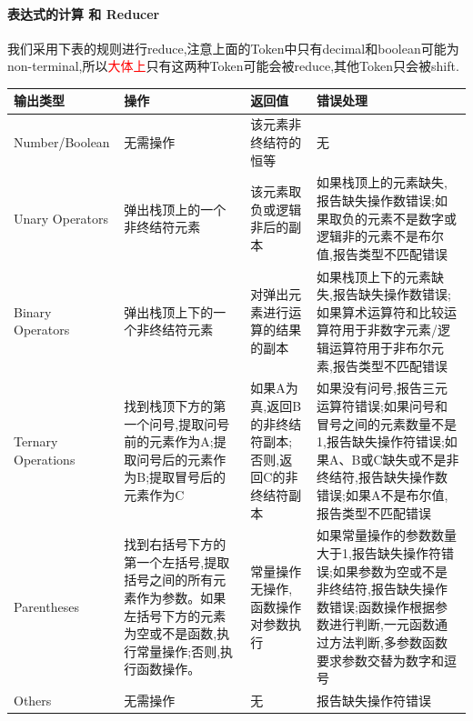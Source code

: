 \documentclass{article}
\begin{document}
\paragraph{表达式的计算 和 Reducer\\}
我们采用下表的规则进行reduce,注意上面的Token中只有decimal和boolean可能为non-terminal,所以\textcolor{red}{大体上}只有这两种Token可能会被reduce,其他Token只会被shift.

\begin{table}[H]
    \centering
    \small
    \begin{tabular}{|m{3.5cm}|m{3cm}|m{3cm}|m{5cm}|}
        \hline
        \textbf{输出类型}        & \textbf{操作}                                                        & \textbf{返回值}                   & \textbf{错误处理}                                                                              \\
        \hline
        Number/Boolean       & 无需操作                                                               & 该元素非终结符的恒等                     & 无                                                                                          \\
        \hline

        Unary Operators      & 弹出栈顶上的一个非终结符元素                                                     & 该元素取负或逻辑非后的副本                  & 如果栈顶上的元素缺失,报告缺失操作数错误;如果取负的元素不是数字或逻辑非的元素不是布尔值,报告类型不匹配错误                                     \\
        \hline
        Binary Operators & 弹出栈顶上下的一个非终结符元素                                                    & 对弹出元素进行运算的结果的副本                & 如果栈顶上下的元素缺失,报告缺失操作数错误;如果算术运算符和比较运算符用于非数字元素/逻辑运算符用于非布尔元素,报告类型不匹配错误                                \\
        \hline
        Ternary Operations   & 找到栈顶下方的第一个问号,提取问号前的元素作为A;提取问号后的元素作为B;提取冒号后的元素作为C                   & 如果A为真,返回B的非终结符副本;否则,返回C的非终结符副本 & 如果没有问号,报告三元运算符错误;如果问号和冒号之间的元素数量不是1,报告缺失操作符错误;如果A、B或C缺失或不是非终结符,报告缺失操作数错误;如果A不是布尔值,报告类型不匹配错误 \\
        \hline
        Parentheses          & 找到右括号下方的第一个左括号,提取括号之间的所有元素作为参数。如果左括号下方的元素为空或不是函数,执行常量操作;否则,执行函数操作。 & 常量操作无操作,函数操作对参数执行              & 如果常量操作的参数数量大于1,报告缺失操作符错误;如果参数为空或不是非终结符,报告缺失操作数错误;函数操作根据参数进行判断,一元函数通过方法判断,多参数函数要求参数交替为数字和逗号 \\
        \hline

        Others               & 无需操作                                                               & 无                              & 报告缺失操作符错误                                                                                  \\
        \hline
    \end{tabular}
\end{table}
\end{document}
